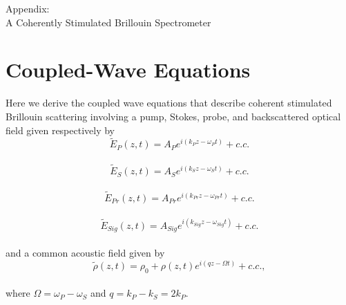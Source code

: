 \documentclass[%
  reprint,
  superscriptaddress,
  amsmath,amssymb,
  aps,
  prapplied,
]{revtex4-2}
\begin{document}
\begin{acknowledgments}

\end{acknowledgments}

\clearpage %
\onecolumngrid %

\begin{titlepage}
\centering
{}
{\Large Appendix:\\[10pt] A Coherently Stimulated Brillouin Spectrometer\par}
\end{titlepage}

\clearpage
\onecolumngrid
\clearpage

\appendix

\section{Coupled-Wave Equations}
\label{Appendix:Coupled-Wave Equations}

Here we derive the coupled wave equations that describe coherent stimulated Brillouin scattering involving a pump, Stokes, probe, and backscattered optical field given respectively by
\\
\begin{equation}
    \tilde{E}_{P}(z,t) = A_{P}e^{i(k_{P}z - \omega_{P}t)} + c.c.
    \label{eq:Pump optical field}
\end{equation}
\\
\begin{equation}
    \tilde{E}_{S}(z,t) = A_{S}e^{i(k_{S}z - \omega_{S}t)} + c.c.
    \label{eq:Stokes optical field}
\end{equation}
\\
\begin{equation}
    \tilde{E}_{Pr}(z,t) = A_{Pr}e^{i(k_{Pr}z - \omega_{Pr}t)} + c.c.
    \label{eq:Probe optical field}
\end{equation}
\\
\begin{equation}
    \tilde{E}_{Sig}(z,t) = A_{Sig}e^{i(k_{Sig}z - \omega_{Sig}t)} + c.c.
    \label{eq:Signal optical field}
\end{equation}
\\
\noindent and a common acoustic field given by
\\
\begin{equation}
    \tilde{\rho}(z,t) = \rho_{0} + \rho(z,t)e^{i(qz - \Omega t)} + c.c.,
    \label{eq:acoustic field}
\end{equation}
\\
\noindent where $\Omega = \omega_{P} - \omega_{S}$ and $q = k_{P} - k_{S} = 2k_{P}$.
\end{document}
